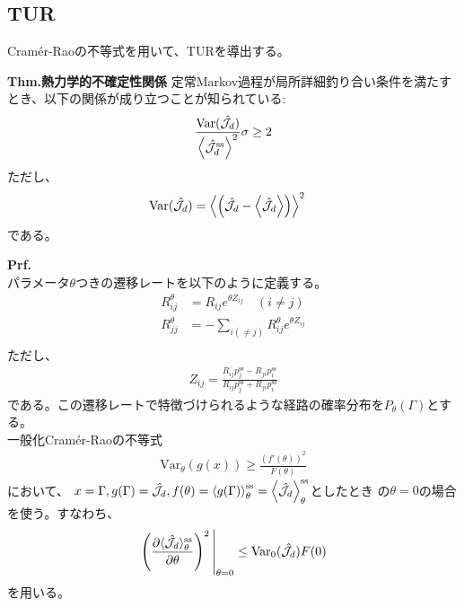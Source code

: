 \documentclass[a4paper,11pt]{jsarticle}
\numberwithin{equation}{section}
\begin{document}
\subsection{TUR}
Cram\'er-Raoの不等式を用いて、TURを導出する。\\
\begin{itembox}[l]{\textbf{Thm.熱力学的不確定性関係}}
    定常Markov過程が局所詳細釣り合い条件を満たすとき、以下の関係が成り立つことが知られている:
    \begin{align}
        \frac{\text{Var}(\hat{\mathcal{J}}_d)}{\ev{\hat{\mathcal{J}}_d^{\text{ss}}}^2} \sigma \geq 2
    \end{align}
    ただし、
    \begin{align}
        \text{Var}(\hat{\mathcal{J}}_d) &= \ev{\qty(\hat{\mathcal{J}}_d -\ev{\hat{\mathcal{J}_d}})}^2
    \end{align}
    である。
\end{itembox}

\textbf{Prf.}\\
パラメータ$\theta$つきの遷移レートを以下のように定義する。
\begin{align}
    R_{ij}^{\theta} &= R_{ij}e^{\theta Z_{ij}} \quad (i \neq j)\\
    R_{jj}^{\theta} &= -\sum_{i (\neq j)} R_{ij}^{\theta}e^{\theta Z_{ij}}\\
\end{align}
ただし、
\begin{align}
    Z_{ij} = \frac{R_{ij}p_j^\text{ss} - R_{ji}p_i^\text{ss}}{R_{ij}p_j^\text{ss} + R_{ji}p_i^\text{ss}}
\end{align}
である。この遷移レートで特徴づけられるような経路の確率分布を$P_{\theta}(\Gamma)$とする。\\
一般化Cram\'er-Raoの不等式
\begin{align}
    \text{Var}_{\theta}(g(x)) \geq \frac{(f'(\theta))^2}{F(\theta)}
\end{align}
において、
$x = \Gamma,g(\Gamma) = \hat{\mathcal{J}}_{d}, f(\theta) = \ev{g(\Gamma)}^{\text{ss}}_{\theta} = \ev{\hat{\mathcal{J}}_{d}}^{\text{ss}}_{\theta}$としたとき
の$\theta = 0$の場合を使う。すなわち、
\begin{align}
\eval{\left( \frac{\partial \langle {\hat{\mathcal{J}}_{d}} \rangle_\theta^{\text{ss}}}{\partial \theta} \right)^2}_{\theta = 0}
\leq \mathrm{Var}_{0} (\hat{\mathcal{J}}_{d}) F(0) \label{eq:1}
\end{align}
を用いる。\\
\end{document}
